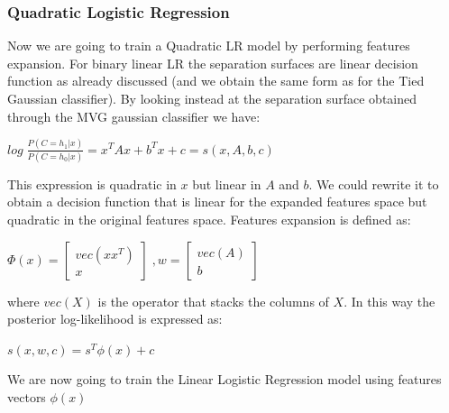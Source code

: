 \documentclass[10pt, a4paper, twocolumn]{article} %
\begin{document}
\subsubsection{Quadratic Logistic Regression}
Now we are going to train a Quadratic LR model by performing features expansion.
For binary linear LR the separation surfaces are linear decision function as already discussed (and
we obtain the same form as for the Tied Gaussian classifier). By looking instead at the separation surface
obtained through the MVG gaussian classifier we have:
\begin{center}
	\begin{math}
		log\;\frac{P(C=h_1|x)}{P(C=h_0|x)} = x^TAx + b^Tx + c = s(x, A, b, c)
	\end{math}
\end{center}
This expression is quadratic in $x$ but linear in $A$ and $b$. 
We could rewrite it to obtain a decision function that is linear for the expanded features space
but quadratic in the original features space. Features expansion is defined as:
\begin{center}
	\begin{math}
		\Phi(x) = \begin{bmatrix}
					vec(xx^T)\\
					x
				  \end{bmatrix} \;, 
		w= 		 \begin{bmatrix}
					vec(A)\\
					b
				  \end{bmatrix}
	\end{math}
\end{center}
where $vec(X)$ is the operator that stacks the columns of $X$. In this way the posterior log-likelihood is expressed as:
\begin{center}
	\begin{math}
		s(x, w, c) = s^T\phi(x)+c
	\end{math}
\end{center}
We are now going to train the Linear Logistic Regression model using features vectors $\phi(x)$
\end{document}
